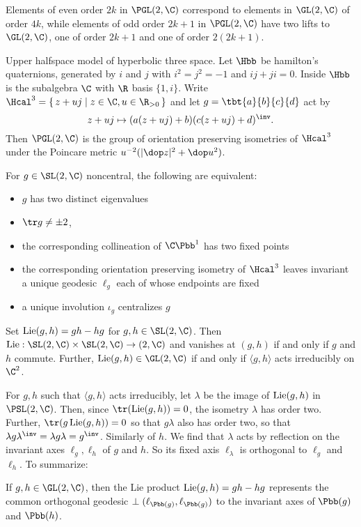 \documentclass[11pt]{amsart}
\begin{document}
Elements of even order $2k$ in $\PGL(2,\C)$ correspond to elements in $\GL(2,\C)$ of order $4k$, while elements of odd order $2k+1$ in $\PGL(2,\C)$ have two lifts to $\GL(2,\C)$, one of order $2k+1$ and one of order $2(2k+1)$. 

Upper halfspace model of hyperbolic three space.  Let $\Hbb$ be hamilton's quaternions, generated by $i$ and $j$ with $i^2=j^2=-1$ and $ij+ji=0$. Inside $\Hbb$ is the subalgebra $\C$ with $\R$ basis $\{1,i\}$. Write $\Hcal^3=\set{z+uj\mid  z\in \C, u\in \R_{>0}}$ and let $g=\tbt{a}{b}{c}{d}$ act by 
		\[z+uj \mapsto (a(z+uj) +b)(c(z+uj)+d)^\inv.\]
Then $\PGL(2,\C)$ is the group of orientation preserving isometries of $\Hcal^3$ under the Poincare metric $u^{-2} (\abs{\dop z}^2 + \dop u^2)$.

For $g\in \SL(2,\C)$ noncentral, the following are equivalent:
	\begin{itemize}
		\item $g$ has two distinct eigenvalues
		\item $\tr g \neq \pm 2$,
		\item the corresponding collineation of $\C \Pbb^1$ has two fixed points 
		\item the corresponding orientation preserving isometry of $\Hcal^3$ leaves invariant a unique geodesic $\ell_g$ each of whose endpoints are fixed
		\item a unique involution $\iota_g$ centralizes $g$
	\end{itemize}
Set $\operatorname{Lie}(g,h)=gh-hg$ for $g,h \in \SL(2,\C)$. Then $\Lie: \SL(2,\C) \times \SL(2,\C) \to \sl(2,\C)$ and vanishes at $(g,h)$ if and only if $g$ and $h$ commute. Further, $\Lie(g,h) \in \GL(2,\C)$ if and only if $\langle g, h \rangle $ acts irreducibly on $\C^2$. 

For $g,h$ such that $\langle g,h\rangle$ acts irreducibly, let $\lambda$ be the image of $\operatorname{Lie}(g,h)$ in $\PSL(2,\C)$. Then, since $\tr(\Lie(g,h))=0$, the isometry $\lambda$ has order two. Further, $\tr(g \Lie(g,h))=0$ so that $g\lambda$ also has order two, so that $\lambda g \lambda^\inv =\lambda g \lambda =g^\inv$. Similarly of $h$. We find that $\lambda$ acts by reflection on the invariant axes $\ell_g,\ell_h$ of $g$ and $h$. So its fixed axis $\ell_\lambda$ is orthogonal to $\ell_g$ and $\ell_h$. To summarize:

\begin{thm}
If $g,h\in \GL(2,\C)$, then the Lie product $\operatorname{Lie}(g,h)=gh-hg$ represents the common orthogonal geodesic $\perp (\ell_{\Pbb(g)},\ell_{\Pbb(g)})$ to the invariant axes of $\Pbb(g)$ and $\Pbb(h)$. 	
\end{thm}
\end{document}
